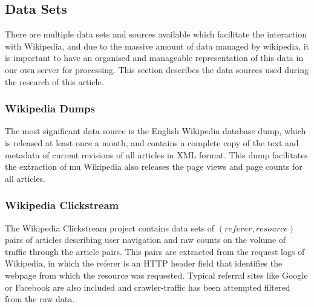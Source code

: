 \subsection{Data Sets}

There are multiple data sets and sources available which facilitate the interaction with Wikipedia, and due to the massive amount of data managed by wikipedia, it is important to have an organised and manageable representation of this data in our own server for processing. This section describes the data sources used during the research of this article.

\subsubsection{Wikipedia Dumps}
The most significant data source is the English Wikipedia database dump, which is released at least once a month, and contains a complete copy of the text and metadata of current revisions of all articles in XML format. This dump facilitates the extraction of mu Wikipedia also releases the page views and page counts for all articles.

\subsubsection{Wikipedia Clickstream}
The Wikipedia Clickstream \cite{wulczyn} project contains data sets of $(referer, resource)$ pairs of articles describing user navigation and raw counts on the volume of traffic through the article pairs. This pairs are extracted from the request logs of Wikipedia, in which the referer is an HTTP header field that identifies the webpage from which the resource was requested. Typical referral sites like Google or Facebook are also included and crawler-traffic has been attempted filtered from the raw data.